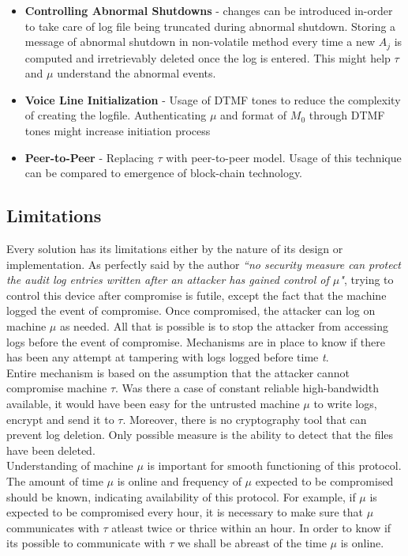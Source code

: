 \documentclass[12pt, letter]{article}
\begin{document}
\begin{itemize}
    \item \textbf{Controlling Abnormal Shutdowns} - changes can be introduced in-order to take care of log file being truncated during abnormal shutdown. Storing a message of abnormal shutdown in non-volatile method every time a new $A_j$ is computed and irretrievably deleted once the log is entered. This might help $\tau$ and $\mu$ understand the abnormal events.
    
    \item \textbf{Voice Line Initialization} - Usage of DTMF tones to reduce the complexity of creating the logfile. Authenticating $\mu$ and format of $M_0$ through DTMF tones might increase initiation process 
    
    \item \textbf{Peer-to-Peer} - Replacing $\tau$ with peer-to-peer model. Usage of this technique can be compared to emergence of block-chain technology.
\end{itemize}

\subsection{Limitations}
\label{sec:limitation}

Every solution has its limitations either by the nature of its design or implementation. As perfectly said by the author \textit{``no security measure can protect the audit log entries written after an attacker has gained control of $\mu$"}, trying to control this device after compromise is futile, except the fact that the machine logged the event of compromise. Once compromised, the attacker can log on machine $\mu$ as needed. All that is possible is to stop the attacker from accessing logs before the event of compromise. Mechanisms are in place to know if there has been any attempt at tampering with logs logged before time \textit{t}.\\

Entire mechanism is based on the assumption that the attacker cannot compromise machine $\tau$. Was there a case of constant reliable high-bandwidth available, it would have been easy for the untrusted machine $\mu$ to write logs, encrypt and send it to $\tau$. Moreover, there is no cryptography tool that can prevent log deletion. Only possible measure is the ability to detect that the files have been deleted.\\

Understanding of machine $\mu$ is important for smooth functioning of this protocol. The amount of time $\mu$ is online and frequency of $\mu$ expected to be compromised should be known, indicating availability of this protocol. For example, if $\mu$ is expected to be compromised every hour, it is necessary to make sure that $\mu$ communicates with $\tau$ atleast twice or thrice within an hour. In order to know if its possible to communicate with $\tau$ we shall be abreast of the time $\mu$ is online.
\end{document}
